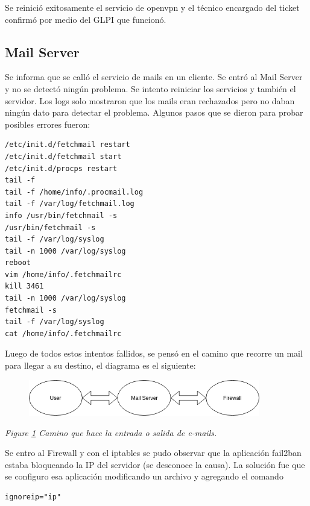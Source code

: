 \documentclass[12pt,a4paper]{article}
\begin{document}
Se reinició exitosamente el servicio de openvpn y el técnico encargado del ticket confirmó por medio del GLPI que funcionó.

\subsection{Mail Server} 
Se informa que se calló el servicio de mails en un cliente. Se entró al Mail Server y no se detectó ningún problema. Se intento reiniciar los servicios y también el servidor. Los logs solo mostraron que los mails eran rechazados pero no daban ningún dato para detectar el problema. Algunos pasos que se dieron para probar posibles errores fueron:

\begin{lstlisting}
/etc/init.d/fetchmail restart
/etc/init.d/fetchmail start 
/etc/init.d/procps restart
tail -f
tail -f /home/info/.procmail.log
tail -f /var/log/fetchmail.log
info /usr/bin/fetchmail -s
/usr/bin/fetchmail -s
tail -f /var/log/syslog
tail -n 1000 /var/log/syslog
reboot
vim /home/info/.fetchmailrc 
kill 3461
tail -n 1000 /var/log/syslog
fetchmail -s
tail -f /var/log/syslog
cat /home/info/.fetchmailrc 
\end{lstlisting}

Luego de todos estos intentos fallidos, se pensó en el camino que recorre un mail para llegar a su destino, el diagrama es el siguiente:

\begin{figure}[h!]
  \centering
   \includegraphics[width=0.9\textwidth]{ms-diagram}
  \label{fig:ms-diagram}
\end{figure}

\begin{center}
\textit{Figure \ref{fig:ms-diagram} Camino que hace la entrada o salida de e-mails.}
\end{center}


Se entro al Firewall y con el iptables se pudo observar que la aplicación fail2ban estaba bloqueando la IP del servidor (se desconoce la causa). La solución fue que se configuro esa aplicación modificando un archivo y agregando el comando

\begin{lstlisting}
ignoreip="ip"
\end{lstlisting}
\end{document}
